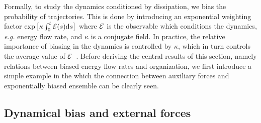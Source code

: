 \documentclass[superscriptaddress, twocolumn, prx, longbibliography, nofootinbib]{revtex4-1}
\providecommand{\DIFaddbegin}{} %
\providecommand{\DIFaddend}{} %
\begin{document}
Formally, to study the dynamics conditioned by dissipation, we bias the probability of trajectories. This is done by introducing an exponential weighting factor $\exp\big[\kappa\int_0^t{\cal E}(s){\rm d}s\big]$ where ${\cal E}$ is the observable which conditions the dynamics, {\it e.g.} energy flow rate, and $\kappa$ is a conjugate field. In practice, the relative importance of biasing in the dynamics is controlled by $\kappa$, which in turn controls the average value of $\cal E$~\cite{Touchette2009}. Before deriving the central results of this section, namely relations between biased energy flow rates and organization, we first introduce a simple example in the which the connection between auxiliary forces and exponentially biased ensemble can be clearly seen.




\subsection{\DIFaddbegin {\DIFaddend Dynamical bias and external forces\DIFaddbegin }\DIFaddend }\label{sec:biasexternal}
\end{document}
